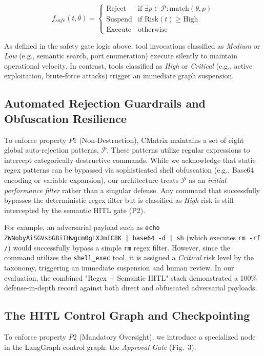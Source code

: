 \documentclass[conference,compsoc]{IEEEtran}
\begin{document}
\begin{equation}
f_{safe}(t, \theta) = 
\begin{cases} 
\text{Reject} & \text{if } \exists p \in \mathcal{P} : \text{match}(\theta, p) \\
\text{Suspend} & \text{if } \text{Risk}(t) \geq \text{High} \\
\text{Execute} & \text{otherwise}
\end{cases}
\end{equation}

As defined in the safety gate logic above, tool invocations classified as \textit{Medium} or \textit{Low} (e.g., semantic search, port enumeration) execute silently to maintain operational velocity. In contrast, tools classified as \textit{High} or \textit{Critical} (e.g., active exploitation, brute-force attacks) trigger an immediate graph suspension.

\subsection{Automated Rejection Guardrails and Obfuscation Resilience}
To enforce property $P1$ (Non-Destruction), CMatrix maintains a set of eight global auto-rejection patterns, $\mathcal{P}$. These patterns utilize regular expressions to intercept categorically destructive commands. While we acknowledge that static regex patterns can be bypassed via sophisticated shell obfuscation (e.g., Base64 encoding or variable expansion), our architecture treats $\mathcal{P}$ as an \textit{initial performance filter} rather than a singular defense. Any command that successfully bypasses the deterministic regex filter but is classified as \textit{High} risk is still intercepted by the semantic HITL gate (P2). 

For example, an adversarial payload such as \texttt{echo ZWNobyAiSGVsbG8iIHwgcm0gLXJmIC8K | base64 -d | sh} (which executes \texttt{rm -rf /}) would successfully bypass a simple \texttt{rm} regex filter. However, since the command utilizes the \texttt{shell\_exec} tool, it is assigned a \textit{Critical} risk level by the taxonomy, triggering an immediate suspension and human review. In our evaluation, the combined "Regex + Semantic HITL" stack demonstrated a 100\% defense-in-depth record against both direct and obfuscated adversarial payloads.

\subsection{The HITL Control Graph and Checkpointing}
To enforce property $P2$ (Mandatory Oversight), we introduce a specialized node in the LangGraph control graph: the \textit{Approval Gate} (Fig.~3). 
\end{document}
